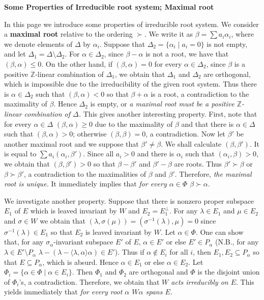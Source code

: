 \documentclass{article}
\newcommand{\InZ}{\mathbb{Z}}
\newcommand{\SBar}{\;|\;}
\begin{document}
\newpage

\textbf{Some Properties of Irreducible root system; Maximal root}

In this page we introduce some properties of irreducible root system.
We consider a \textbf{maximal root} relative to the ordering $\succ$.
We write it as $\beta = \sum a_i \alpha_i$, where we denote elements of $\Delta$ by $\alpha_i$.
Suppose that $\Delta_2 = \{\alpha_i \SBar a_i = 0\}$ is not empty, and let $\Delta_1 = \Delta \setminus \Delta_2$.
For $\alpha \in \Delta_2$, since $\beta - \alpha$ is not a root, we have that $(\beta, \alpha) \le 0$.
On the other hand, if $(\beta, \alpha) = 0$ for every $\alpha \in \Delta_2$, since $\beta$ is a positive $\InZ$-linear combination of $\Delta_1$, we obtain that $\Delta_1$ and $\Delta_2$ are orthogonal, which is impossible due to the irreducibility of the given root system.
Thus there is $\alpha \in \Delta_2$ such that $(\beta, \alpha) < 0$ so that $\beta + \alpha$ is a root, a contradiction to the maximality of $\beta$.
Hence $\Delta_2$ is empty, or \textit{a maximal root must be a positive $\InZ$-linear combination of $\Delta$.}
This gives another interesting property.
First, note that for every $\alpha \in \Delta$ $(\beta, \alpha) \ge 0$ due to the maximality of $\beta$ and that there is $\alpha \in \Delta$ such that $(\beta, \alpha) > 0$; otherwise $(\beta, \beta) = 0$, a contradiction.
Now let $\beta'$ be another maximal root and we suppose that $\beta' \ne \beta$.
We shall calculate $(\beta, \beta')$.
It is equal to $\sum a_i (\alpha_i, \beta')$.
Since all $a_i > 0$ and there is $\alpha_i$ such that $(\alpha_i, \beta) > 0$, we obtain that $(\beta, \beta') > 0$ so that $\beta - \beta'$ and $\beta' - \beta$ are roots.
Thus $\beta' \succ \beta$ or $\beta \succ \beta'$, a contradiction to the maximalities of $\beta$ and $\beta'$.
Therefore, \textit{the maximal root is unique.}
It immediately implies that \textit{for every $\alpha \in \Phi$ $\beta \succ \alpha$}.

We investigate another property.
Suppose that there is nonzero proper subspace $E_1$ of $E$ which is leaved invariant by $W$ and $E_2 = E_1^\perp$.
For any $\lambda \in E_1$ and $\mu \in E_2$ and $\sigma \in W$ we obtain that $(\lambda, \sigma(\mu)) = (\sigma^{-1}(\lambda), \mu) = 0$ since $\sigma^{-1}(\lambda) \in E_1$ so that $E_2$ is leaved invariant by $W$.
Let $\alpha \in \Phi$.
One can show that, for any $\sigma_\alpha$-invariant subspace $E'$ of $E$, $\alpha \in E'$ or else $E' \in P_\alpha$ (N.B., for any $\lambda \in E' \setminus P_\alpha$ $\lambda - \left( \lambda - \langle \lambda, \alpha \rangle \alpha \right) \in E'$).
Thus if $\alpha \notin E_i$ for all $i$, then $E_1, E_2 \subseteq P_\alpha$ so that $E \subseteq P_\alpha$, which is absurd.
Hence $\alpha \in E_1$ or else $\alpha \in E_2$.
Let $\Phi_i = \{\alpha \in \Phi \SBar \alpha \in E_i\}$.
Then $\Phi_1$ and $\Phi_2$ are orthogonal and $\Phi$ is the disjoint union of $\Phi_i$'s, a contradiction.
Therefore, we obtain that \textit{$W$ acts irreducibly on $E$}.
This yields immediately that \textit{for every root $\alpha$ $W\alpha$ spans $E$.}
\end{document}
